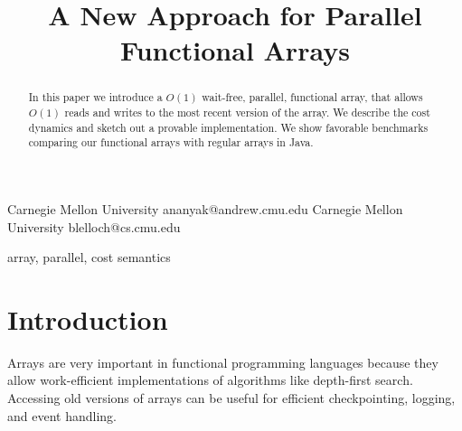 \documentclass[preprint]{sigplanconf}
\begin{document}
\setlength{\pdfpageheight}{\paperheight}
\setlength{\pdfpagewidth}{\paperwidth}




\title{A New Approach for Parallel Functional Arrays}

           {Carnegie Mellon University}
           {ananyak@andrew.cmu.edu}
           {Carnegie Mellon University}
           {blelloch@cs.cmu.edu}

\maketitle

\newtheorem{theorem}{Theorem}[section]
\newtheorem{corollary}{Corollary}[theorem]
\newtheorem{lemma}[theorem]{Lemma}
\theoremstyle{definition}
\newtheorem{definition}{Definition}[section]

\begin{abstract}
In this paper we introduce a $O(1)$ wait-free, parallel, functional array, that allows $O(1)$ reads and writes to the most recent version of the array. We describe the cost dynamics and sketch out a provable implementation. We show favorable benchmarks comparing our functional arrays with regular arrays in Java.
\end{abstract}


\keywords
array, parallel, cost semantics

\section{Introduction}

Arrays are very important in functional programming languages because they allow work-efficient implementations of algorithms like depth-first search. Accessing old versions of arrays can be useful for efficient checkpointing, logging, and event handling.
\end{document}
